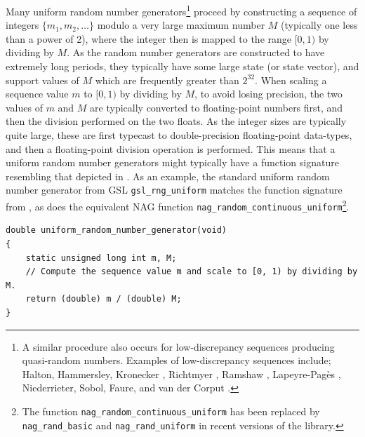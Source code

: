 \documentclass[11pt,a4paper,twoside,english]{extarticle}
\begin{document}
Many uniform random number generators\footnote{%
A similar procedure also occurs for low-discrepancy sequences producing quasi-random numbers. Examples of low-discrepancy sequences include; Halton, 
Hammersley,
Kronecker \citep[1.1.53]{iaco2015low},
Richtmyer \citep{ramamoorthy2008low},
Ramshaw \citep{ramshaw1981discrepancy},
Lapeyre-Pag\`{e}s \citep[2.C.4.3]{bouleau1994numerical},
Niederrieter, 
Sobol, 
Faure, 
and van der Corput \citep{gentle2005random,tezuka1995uniform,glasserman2013monte,bouleau1994numerical}.}
proceed by constructing a sequence of integers $ \{m_1, m_2, \ldots \} $ modulo a very large maximum number $ M $ (typically one less than a power of 2), where the integer then is mapped to the range $ [0, 1) $ by dividing by $ M $. As the random number generators are constructed to have extremely long periods, they typically have some large state (or state vector), and support values of $ M $ which are frequently greater than $ 2^{32} $. When scaling a sequence value $ m $ to $ [0, 1) $ by dividing by $ M $, to avoid losing precision, the two values of $ m $ and $ M $ are typically converted to floating-point numbers first, and then the division performed on the two floats. As the integer sizes are typically quite large, these are first typecast to double-precision floating-point data-types, and then a floating-point division operation is performed. This means that a uniform random number generators might typically have a function signature resembling that depicted in . As an example, the standard uniform random number generator from GSL \verb|gsl_rng_uniform| matches the function signature from , as does the equivalent NAG function \verb|nag_random_continuous_uniform|\footnote{The function \verb|nag_random_continuous_uniform| has been replaced by \verb|nag_rand_basic| and \verb|nag_rand_uniform| in recent versions of the \nag library.}.

\begin{lstfloat}[htb]
\begin{lstlisting}[style=C, captionpos=b, caption={[A typical uniform random number generator function signature]A typical uniform random number generator function signature.}, label={code:c:typical_uniform_rng_function_signature}]
double uniform_random_number_generator(void)
{
    static unsigned long int m, M; 
    // Compute the sequence value m and scale to [0, 1) by dividing by M.
    return (double) m / (double) M;
}
\end{lstlisting}
\end{lstfloat}
\end{document}
